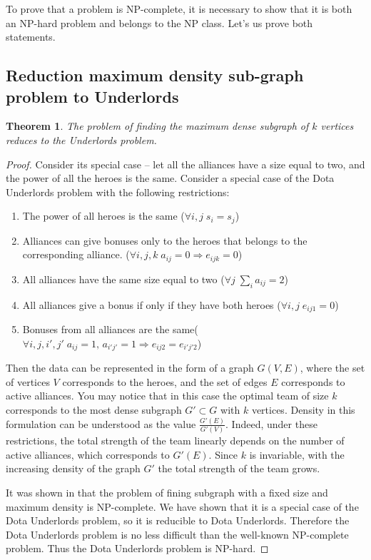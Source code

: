 \documentclass{article}
\newtheorem{theorem}{Theorem}
\begin{document}
To prove that a problem is NP-complete, it is necessary to show that it is both an NP-hard problem and belongs to the NP class. Let's us prove both statements.

\subsection{Reduction maximum density sub-graph problem to Underlords}

\begin{theorem}
\label{MEWC_DU}
The problem of finding the maximum dense subgraph of $k$ vertices reduces to the Underlords problem.
\end{theorem}
\begin{proof}

Consider its special case -- let all the alliances have a size equal to two, and the power of all the heroes is the same. Consider a special case of the Dota Underlords problem with the following restrictions:

\begin{enumerate}
    \item The power of all heroes is the same ($\forall i, j \; s_i=s_j$)
    \item Alliances can give bonuses only to the heroes that belongs to the corresponding alliance. ($\forall i, j, k \; a_{ij}=0 \Longrightarrow e_{ijk} = 0$)
    
    \item All alliances have the same size equal to two ($\forall j \; \sum_i a_{ij}=2 $)
    \item All alliances give a bonus if only if they have both heroes ($\forall i, j \; e_{ij1}=0$)
    \item Bonuses from all alliances are the same($\forall i, j, i', j' \; a_{ij}=1,\, a_{i' j'}=1 \Longrightarrow e_{ij2}=e_{i' j' 2}$)
\end{enumerate}

Then the data can be represented in the form of a graph $G(V, E) $, where the set of vertices $ V $ corresponds to the heroes, and the set of edges $E$ corresponds to active alliances. You may notice that in this case the optimal team of size $ k $ corresponds to the most dense subgraph $ G' \subset G $ with $ k $ vertices. Density in this formulation can be understood as the value $ \frac{G'(E)}{G'(V)} $. Indeed, under these restrictions, the total strength of the team linearly depends on the number of active alliances, which corresponds to $ G'(E)$. Since $ k $ is invariable, with the increasing density of the graph $ G '$ the total strength of the team grows.

It was shown in \cite{downey1995fixed} that the problem of fining subgraph with a fixed size and maximum density is NP-complete. We have shown that it is a special case of the Dota Underlords problem, so it is reducible to Dota Underlords. Therefore the Dota Underlords problem is no less difficult than the well-known NP-complete problem. Thus the Dota Underlords problem is NP-hard.

\end{proof}
\end{document}
